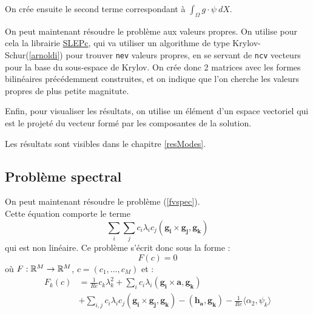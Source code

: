 

On crée ensuite le second terme correspondant à $\int_\Omega g\cdot\psi\ dX$.



On peut maintenant résoudre le problème aux valeurs propres. On utilise pour cela la librairie \href{http://www.grycap.upv.es/slepc/}{SLEPc}, qui va utiliser un algorithme de type Krylov-Schur(\ref{arnoldi}) pour trouver \texttt{nev} valeurs propres, en se servant de \texttt{ncv} vecteurs pour la base du sous-espace de Krylov. On crée donc 2 matrices avec les formes bilinéaires précédemment construites, et on indique que l'on cherche les valeurs propres de plus petite magnitute.



Enfin, pour visualiser les résultats, on utilise un élément d'un espace vectoriel qui est le projeté du vecteur formé par les composantes de la solution.



Les résultats sont visibles dans le chapitre \ref{resModes}.

\fi

\subsection{Problème spectral}

On peut maintenant résoudre le problème (\ref{fvspec}).\\
Cette équation comporte le terme
\[
\sum_i\sum_j c_i\lambda_i c_j(\mathbf{g_i}\times \mathbf{g_j}, \mathbf{g_k})
\]
qui est non linéaire. Ce problème s'écrit donc sous la forme :
\[
F(c) = 0
\]
où $F:{\mathbb{R}}^M\rightarrow{\mathbb{R}}^M$, $c=(c_1,\ldots, c_M)$ et :
\begin{align*}
F_k(c) &= \frac{1}{Re} c_k\lambda_k^2 + \sum_i c_i\lambda_i(\mathbf{g_i}\times \mathbf{a}, \mathbf{g_k})\\
&+ \sum_{i,j} c_i\lambda_i c_j (\mathbf{g_i}\times \mathbf{g_j}, \mathbf{g_k}) - (\mathbf{h_a},\mathbf{g_k}) - \frac{1}{Re}\langle \alpha_2, \psi_k \rangle
\end{align*}

